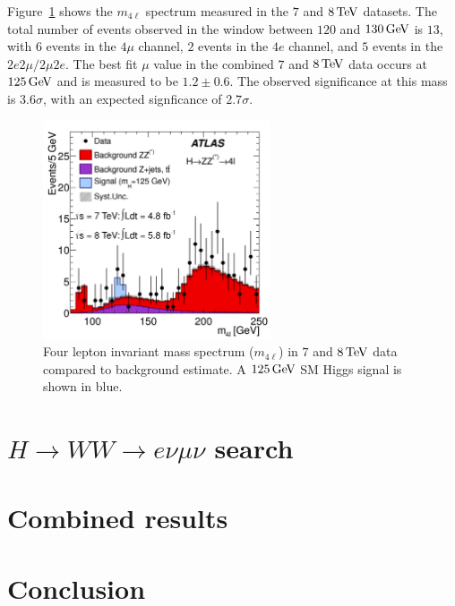 Figure~\ref{fig:disc_zz_result} shows the $m_{4\ell}$ spectrum measured in the $7$ and $8 \TeV$ datasets. The total number of events observed in the window between $120$ and $130 \GeV$ is $13$, with $6$ events in the $4\mu$ channel, $2$ events in the $4e$ channel, and $5$ events in the $2e2\mu/2\mu2e$. The best fit $\mu$ value in the combined $7$ and $8 \TeV$ data occurs at $125 \GeV$ and is measured to be $1.2 \pm 0.6$. The observed significance at this mass is $3.6\sigma$, with an expected signficance of $2.7\sigma$. 

\begin{figure}[h!]
  \centering
  \captionsetup{justification=centering}
  \includegraphics[width=0.6\textwidth]{figures/discovery_m4l}
  \caption{Four lepton invariant mass spectrum ($m_{4\ell}$) in $7$ and $8 \TeV$ data compared to background estimate. A $125 \GeV$ SM Higgs signal is shown in blue\cite{Discovery}.}
  \label{fig:disc_zz_result}
\end{figure}

\section{$H\to WW \to e\nu\mu\nu$ search}



\section{Combined results}

\section{Conclusion}


